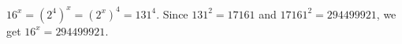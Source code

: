 $16^x=\left(2^4\right)^x=\left(2^x\right)^4=131^4$. Since $131^2=17161$ and $17161^2=294499921$, we get $16^x=\boxed{294499921}$.
